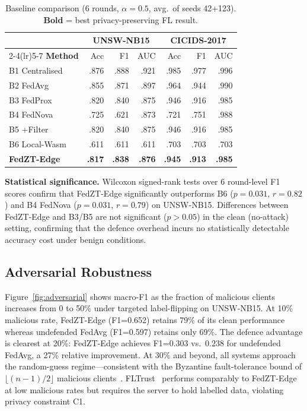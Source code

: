 \documentclass[11pt,a4paper,twocolumn]{article}
\theoremstyle{definition}
\begin{document}
\begin{table}[htbp]
\caption{Baseline comparison (6 rounds, $\alpha{=}0.5$, avg.\ of seeds
  42+123).  \textbf{Bold} = best privacy-preserving FL result.}
\label{tab:baselines}
\centering\scriptsize
\setlength{\tabcolsep}{4pt}
\begin{tabular}{@{}lrrrrrr@{}}
\toprule
 & \multicolumn{3}{c}{\textbf{UNSW-NB15}}
 & \multicolumn{3}{c}{\textbf{CICIDS-2017}} \\
\cmidrule(lr){2-4}\cmidrule(lr){5-7}
\textbf{Method} & Acc & F1 & AUC & Acc & F1 & AUC \\
\midrule
B1 Centralised   & .876 & .888 & .921 & .985 & .977 & .996 \\
B2 FedAvg        & .855 & .871 & .897 & .964 & .944 & .990 \\
B3 FedProx       & .820 & .840 & .875 & .946 & .916 & .985 \\
B4 FedNova       & .725 & .621 & .873 & .721 & .751 & .988 \\
B5 +Filter       & .820 & .840 & .875 & .946 & .916 & .985 \\
B6 Local-Wasm    & .611 & .611 & .611 & .703 & .703 & .703 \\
\midrule
\textbf{FedZT-Edge} & \textbf{.817} & \textbf{.838} & \textbf{.876}
  & \textbf{.945} & \textbf{.913} & \textbf{.985} \\
\bottomrule
\end{tabular}
\end{table}

\textbf{Statistical significance.}
Wilcoxon signed-rank tests over 6 round-level F1 scores confirm that
FedZT-Edge significantly outperforms B6 ($p=0.031$, $r=0.82$) and
B4 FedNova ($p=0.031$, $r=0.79$) on UNSW-NB15.  Differences between
FedZT-Edge and B3/B5 are not significant ($p>0.05$) in the clean
(no-attack) setting, confirming that the defence overhead incurs no
statistically detectable accuracy cost under benign conditions.

\subsection{Adversarial Robustness}
\label{sec:adv}

Figure~\ref{fig:adversarial} shows macro-F1 as the fraction of malicious
clients increases from 0 to 50\% under targeted label-flipping on
UNSW-NB15.  At 10\% malicious rate, FedZT-Edge (F1=0.652) retains
79\% of its clean performance whereas undefended FedAvg (F1=0.597)
retains only 69\%.  The defence advantage is clearest at 20\%: FedZT-Edge
achieves F1=0.303 vs.\ 0.238 for undefended FedAvg, a 27\% relative
improvement.  At 30\% and beyond, all systems approach the random-guess
regime---consistent with the Byzantine fault-tolerance bound of
$\lfloor(n{-}1)/2\rfloor$ malicious clients~\cite{lamport1982byzantine}.
FLTrust~\cite{cao2022} performs comparably to FedZT-Edge at low
malicious rates but requires the server to hold labelled data, violating
privacy constraint C1.
\end{document}
